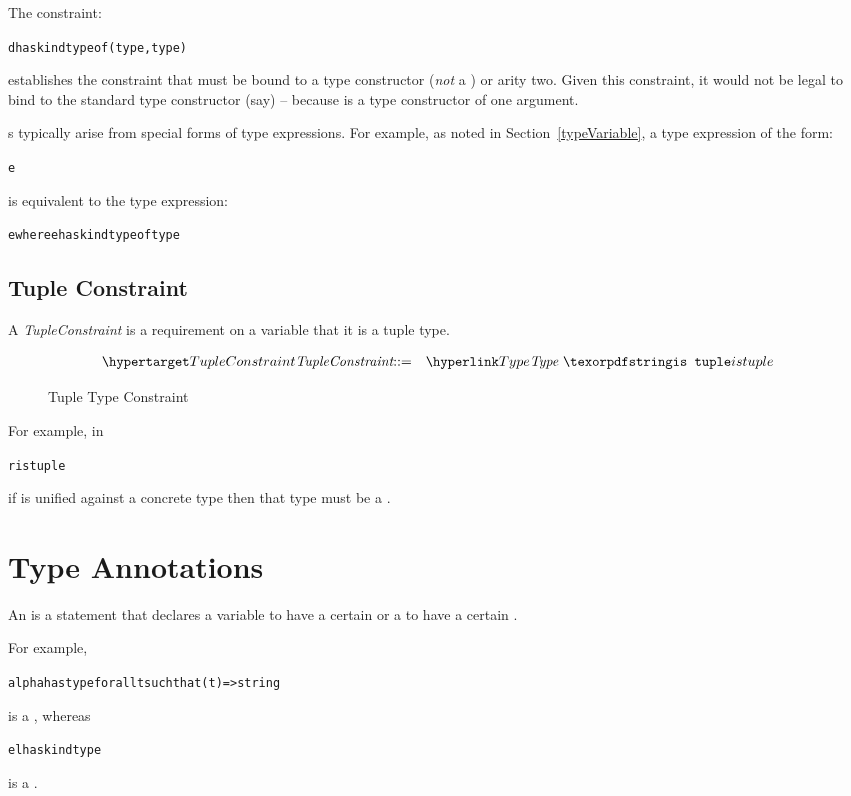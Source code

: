 The constraint:
\begin{alltt}
\pcent{}d has kind type of (type,type)
\end{alltt}
establishes the constraint that  must be bound to a type constructor (\emph{not} a ) or arity two. Given this constraint, it would not be legal to bind  to the standard type constructor  (say) -- because  is a type constructor of one argument.

\begin{aside}
s typically arise from special forms of type expressions. For example, as noted in Section~\vref{typeVariable}, a type expression of the form:
\begin{alltt}
\pcent{}\pcent{}e
\end{alltt}
is equivalent to the type expression:
\begin{alltt}
\pcent{}e where \pcent{}e has kind type of type
\end{alltt}
\end{aside}

\subsection{Tuple Constraint}
\label{tupleConstraint}

A \emph{TupleConstraint} is a requirement on a variable that it is a tuple type.

\begin{figure}[htbp]
\begin{eqnarray*}
\ntDef{TupleConstraint}&\arrow&\ntRef{Type}\ \q{is tuple}
\end{eqnarray*}
\caption{Tuple Type Constraint}
\label{tupleConstraintFig}
\end{figure}

For example, in
\begin{alltt}
\pcent{}r is tuple
\end{alltt}
if  is unified against a concrete type then that type must be a .

\section{Type Annotations}
\label{typeAnnotation}
An  is a statement that declares a variable to have a certain  or a  to have a certain .

For example, 
\begin{alltt}
alpha has type for all t such that (t)=>string
\end{alltt}
is a , whereas
\begin{alltt}
el has kind type
\end{alltt}
is a .

